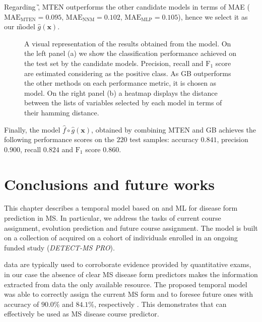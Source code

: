 Regarding \G, MTEN outperforms the other candidate models in terms of MAE ( $\text{MAE}_{\text{MTEN}}=0.095$, $\text{MAE}_{\text{NNM}}=0.102$, $\text{MAE}_{\text{MLP}}=0.105$), hence we select it as our \G model $\hat{g}(\bm{x})$.


 \begin{figure}[h!]
	\centering
	 \hfill%
	\caption{A visual representation of the results obtained from the \F model. On the left panel (a) we show the classification performance achieved on the test set by the candidate models. Precision, recall and $\text{F}_1$ score are estimated considering \SP as the positive class. As GB outperforms the other methods on each performance metric, it is chosen as \F model. On the right panel (b) a heatmap displays the distance between the lists of variables selected by each model in terms of their hamming distance. }\label{fig:f}
\end{figure}


%
Finally, the \FOG model $\hat{f} \circ \hat{g}(\bm{x})$, obtained by combining MTEN and GB achieves the following performance scores on the $220$ test samples: accuracy $0.841$, precision $0.900$, recall $0.824$ and $\text{F}_1$ score $0.860$.


\section{Conclusions and future works}

This chapter describes a temporal model based on \PCOs and ML for disease form prediction in MS.
In particular, we address the tasks of current course assignment, \PCOs evolution prediction and future course assignment. The model is built on a collection of \PCOs acquired on a cohort of individuals enrolled in an ongoing funded study (\textit{DETECT-MS PRO}).

\PCOs data are typically used to corroborate evidence provided by quantitative exams, in our case the absence of clear MS disease form predictors makes the information extracted from \PCOs data the only available resource.
The proposed temporal model was able to correctly assign the current MS form and to foresee future ones with accuracy of $90.0\%$ and $84.1\%$, respectively .
This demonstrates that \PCOs can effectively be used as MS disease course predictor.

